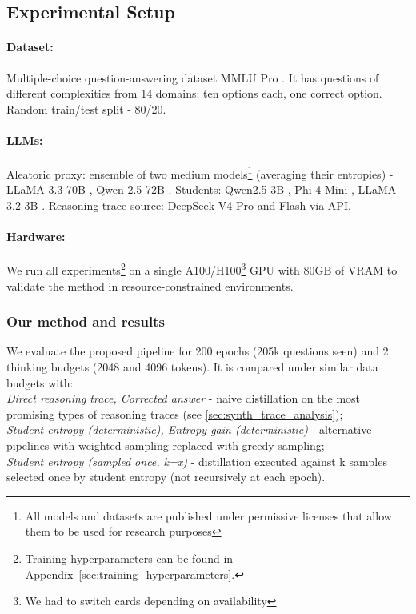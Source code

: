 \documentclass[11pt]{article}
\begin{document}
\subsection{Experimental Setup}

\paragraph{Dataset:} Multiple-choice question-answering dataset MMLU Pro \citep{wang2024mmluprorobustchallengingmultitask}.
It has questions of different complexities from 14 domains: ten options each, one correct option. Random train/test split - 80/20.

\paragraph{LLMs:}
Aleatoric proxy: ensemble of two medium models\footnote{All models and datasets are published under permissive licenses that allow them to be used for research purposes} (averaging their entropies) - LLaMA 3.3 70B \citep{grattafiori2024llama3herdmodels}, Qwen 2.5 72B \citep{qwen2.5}.
Students: Qwen2.5 3B \citep{qwen2.5}, Phi-4-Mini \citep{microsoft2025phi4minitechnicalreportcompact}, LLaMA 3.2 3B \citep{grattafiori2024llama3herdmodels}.
Reasoning trace source: DeepSeek V4 Pro and Flash \citep{deepseekai2026deepseekv4highlyefficientmilliontoken} via API.

\paragraph{Hardware:} We run all experiments\footnote{Training hyperparameters can be found in Appendix~\ref{sec:training_hyperparameters}.} on a single A100/H100\footnote{We had to switch cards depending on availability} GPU with 80GB of VRAM to validate the method in resource-constrained environments.

\subsubsection{Our method and results}

We evaluate the proposed pipeline for 200 epochs (205k questions seen) and 2 thinking budgets (2048 and 4096 tokens).
It is compared under similar data budgets with:\\
\emph{Direct reasoning trace, Corrected answer} - naive distillation on the most promising types of reasoning traces (see \ref{sec:synth_trace_analysis});\\
\emph{Student entropy (deterministic), Entropy gain (deterministic)} - alternative pipelines with weighted sampling replaced with greedy sampling;\\
\emph{Student entropy (sampled once, k={x})} - distillation executed against k samples selected once by student entropy (not recursively at each epoch).
\end{document}
